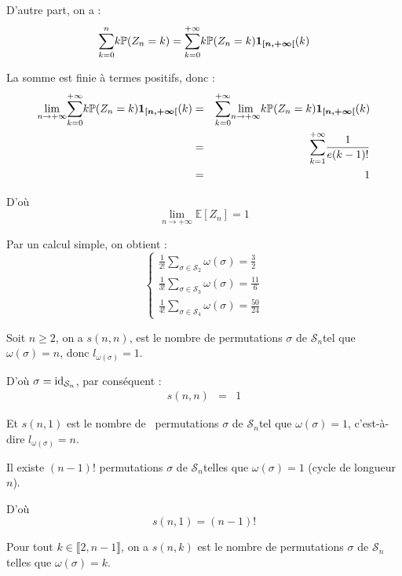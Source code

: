 D'autre part, on a :
\[ \underset{k = 0}{\overset{n}{\sum}} k\mathbb{P} (Z_n = k) = \underset{k =
   0}{\overset{+ \infty}{\sum}} k\mathbb{P} (Z_n = k)
   \underset{}{\boldsymbol{1_{[n, + \infty [}}} (k) \]


La somme est finie {\`a} termes positifs, donc :
\begin{eqnarray*}
  \underset{n \rightarrow + \infty}{\lim} \underset{k = 0}{\overset{+
  \infty}{\sum}} k\mathbb{P} (Z_n = k) \underset{}{\boldsymbol{1_{[n, + \infty
  [}}} (k) & = & \underset{k = 0}{\overset{+ \infty}{\sum}} \underset{n
  \rightarrow + \infty}{\lim} k\mathbb{P} (Z_n = k)
  \underset{}{\boldsymbol{1_{[n, + \infty [}}} (k)\\
  & = & \underset{k = 1}{\overset{+ \infty}{\sum}} \frac{1}{e (k - 1) !}\\
  & = & 1
\end{eqnarray*}


D'o{\`u}
\[ \underset{n \rightarrow + \infty}{\lim} \mathbb{E} [Z_n] = 1 \]


 Par un calcul simple, on obtient :
\[ \left\{\begin{array}{l}
     \frac{1}{2!} \underset{\sigma \in \mathcal{S}_2}{\sum} \omega (\sigma) =
     \frac{3}{2}\\
     \frac{1}{3!} \underset{\sigma \in \mathcal{S}_3}{\sum} \omega (\sigma) =
     \frac{11}{6}\\
     \frac{1}{4!} \underset{\sigma \in \mathcal{S}_4}{\sum} \omega (\sigma) =
     \frac{50}{24}
   \end{array}\right. \]


 Soit $n \geqslant 2$, on a $s (n, n)$, est le nombre de
permutations $\sigma$ de $\mathcal{S}_n $tel que $\omega (\sigma) = n$, donc
$l_{\omega (\sigma)} = 1$.

D'o{\`u} $\sigma = \operatorname{id}_{\mathcal{S}_n}$, par cons{\'e}quent :
\begin{eqnarray*}
  s (n, n) & = & 1
\end{eqnarray*}


Et $s (n, 1)$ est le nombre de \ permutations $\sigma$ de $\mathcal{S}_n $tel
que $\omega (\sigma) = 1$, c'est-{\`a}-dire $l_{\omega (\sigma)} = n$.

Il existe $(n - 1) !$ permutations $\sigma$ de $\mathcal{S}_n $telles que
$\omega (\sigma) = 1$ (cycle de longueur $n$).

D'o{\`u}
\[ s (n, 1) = (n - 1) ! \]


Pour tout $k \in \llbracket 2, n - 1 \rrbracket$, on a $s (n, k)$ est le
nombre de permutations $\sigma$ de $\mathcal{S}_n $telles que $\omega (\sigma)
= k$.

